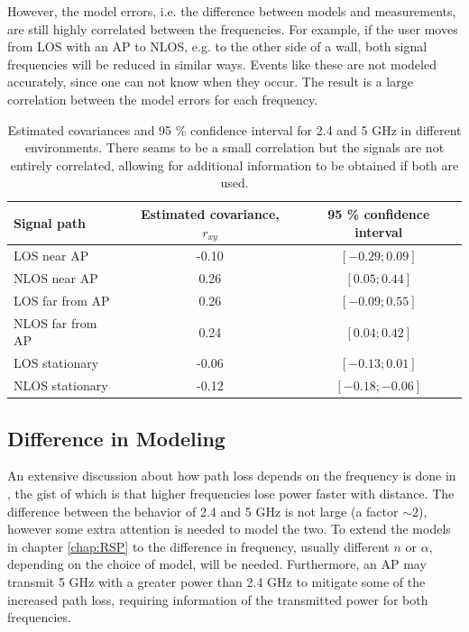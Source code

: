 \documentclass{LTHthesis}
\begin{document}
However, the model errors, i.e. the difference between models and measurements, are still highly correlated between the frequencies. For example, if the user moves from LOS with an AP to NLOS, e.g. to the other side of a wall, both signal frequencies will be reduced in similar ways. Events like these are not modeled accurately, since one can not know when they occur. The result is a large correlation between the model errors for each frequency.
%
\begin{table}
\begin{center}
\begin{tabular}{|l|c|c|}
\hline
Signal path & Estimated covariance, $r_{xy}$ & 95 \% confidence interval \\
\hline
\hline
LOS near AP& -0.10 & $[-0.29;0.09]$ \\
\hline
NLOS near AP& 0.26 & $[0.05;0.44]$  \\
\hline
LOS far from AP& 0.26 & $[-0.09;0.55]$\\
\hline
NLOS far from AP& 0.24& $[0.04; 0.42]$ \\
\hline
LOS stationary  &-0.06 & $[-0.13;0.01]$ \\
\hline
NLOS stationary  & -0.12 &$[-0.18;-0.06]$ \\
\hline
\end{tabular}
\end{center}
\caption{Estimated covariances and 95 \% confidence interval for 2.4 and 5 GHz in different environments. There seams to be a small correlation but the signals are not entirely correlated, allowing for additional information to be obtained if both are used.}\label{corr_conf}
\end{table}
%
\subsection{Difference in Modeling}
%
An extensive discussion about how path loss depends on the frequency is done in \cite{rappaport96}, the gist of which is that higher frequencies lose power faster with distance. The difference between the behavior of 2.4 and 5 GHz is not large (a factor $\sim 2$), however some extra attention is needed to model the two. To extend the models in chapter \ref{chap:RSP} to the difference in frequency, usually different $n$ or $\alpha$, depending on the choice of model, will be needed. Furthermore, an AP may transmit 5 GHz with a greater power than 2.4 GHz to mitigate some of the increased path loss, requiring information of the transmitted power for both frequencies.  
%
\end{document}

